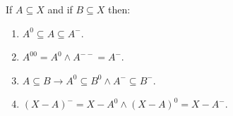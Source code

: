 If $A \subseteq X$ and if $B \subseteq X$ then:
\begin{enumerate}
\item $A^0 \subseteq A \subseteq A^-$.
\item $A^{00} = A^0 \land A^{--} = A^-$.
\item $A \subseteq B \rightarrow A^0 \subseteq B^0 \land A^- \subseteq B^-$.
\item $(X - A)^- = X - A^0 \land (X - A)^0 = X - A^-$.
\end{enumerate}
